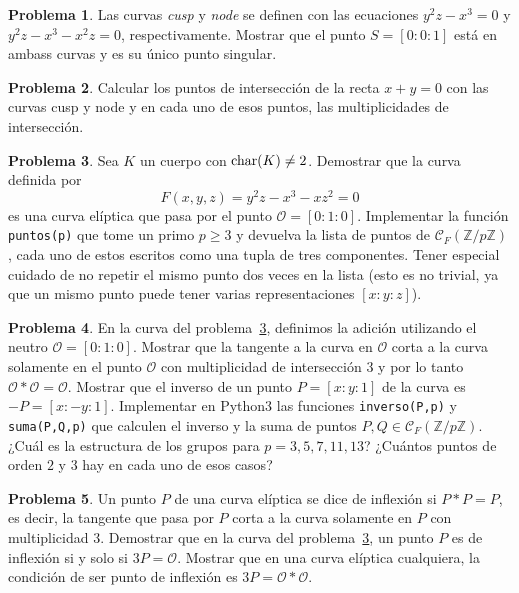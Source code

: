\documentclass[a4paper, 11pt]{article}
\newcommand{\ZZ}{\mathbb{Z}}
\newcounter{numerodetema}
\theoremstyle{plain}
\theoremstyle{definition}
\newtheorem{prob}{Problema}[numerodetema]
\begin{document}
\begin{prob}
Las curvas \emph{cusp} y \emph{node} se definen con las ecuaciones
$y^2z-x^3=0$ y $y^2z-x^3-x^2z=0$, respectivamente. Mostrar que el punto
$S=[0:0:1]$ está en ambass curvas y es su único punto singular.
\end{prob}

\begin{prob}
Calcular los puntos de intersección de la recta $x+y=0$ con las curvas cusp y
node y en cada uno de esos puntos, las multiplicidades de intersección.
\end{prob}

\begin{prob}\label{prob73}
Sea $K$ un cuerpo con ${\rm char}(K)\neq 2$. Demostrar que la curva definida por
\[F(x,y,z)=y^2z-x^3-xz^2=0\] es una curva elíptica que pasa por el punto
$\mathcal{O}=[0:1:0]$. Implementar la función \texttt{puntos(p)} que tome un primo
$p\geq 3$ y devuelva la lista de puntos de $\mathcal{C}_F(\ZZ/p\ZZ)$, cada uno de
estos escritos como una tupla de tres componentes. Tener especial cuidado
de no repetir el mismo punto dos veces en la lista (esto es no trivial, ya que un mismo
punto puede tener varias representaciones $[x:y:z]$).
\end{prob}

\begin{prob}\label{prob74}
En la curva del problema~\ref{prob73}, definimos la adición utilizando el neutro
$\mathcal{O}=[0:1:0]$. Mostrar que la tangente a la curva en $\mathcal{O}$ corta
a la curva solamente en el punto $\mathcal{O}$ con multiplicidad de intersección $3$
y por lo tanto $\mathcal{O}*\mathcal{O}=\mathcal{O}$. Mostrar que el inverso de un
punto $P=[x:y:1]$ de la curva es $-P=[x:-y:1]$. Implementar en Python3 las funciones
\texttt{inverso(P,p)} y \texttt{suma(P,Q,p)} que calculen el inverso y la suma de
puntos $P,Q\in\mathcal{C}_F(\ZZ/p\ZZ)$. ¿Cuál es la estructura de los grupos para
$p=3,5,7,11,13$? ¿Cuántos puntos de orden $2$ y $3$ hay en cada uno de esos casos?
\end{prob}

\begin{prob}
Un punto $P$ de una curva elíptica se dice de inflexión si $P*P=P$, es decir, la
tangente que pasa por $P$ corta a la curva solamente en $P$ con multiplicidad $3$.
Demostrar que en la curva del problema~\ref{prob73}, un punto $P$ es de inflexión
si y solo si $3P=\mathcal{O}$. Mostrar que en una curva elíptica cualquiera, la
condición de ser punto de inflexión es $3P=\mathcal{O}*\mathcal{O}$.
\end{prob}
\end{document}
